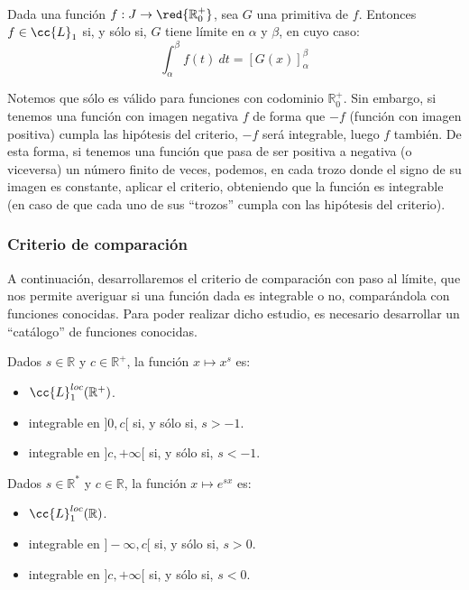 \begin{teo}\ \\
    Dada una función $f:J\rightarrow\red{\mathbb{R}^+_0}$, sea $G$ una primitiva de $f$. Entonces $f\in \cc{L}_1$ si, y sólo si, $G$ tiene límite en $\alpha$ y $\beta$, en cuyo caso:
    \begin{equation*}
        \displaystyle\int_{\alpha}^{\beta} f(t)~dt  = {[G(x)]}_\alpha^\beta
    \end{equation*}
\end{teo}
Notemos que sólo es válido para funciones con codominio $\mathbb{R}^+_0$. Sin embargo, si tenemos una función con imagen negativa $f$ de forma que $-f$ (función con imagen positiva) cumpla las hipótesis del criterio, $-f$ será integrable, luego $f$ también. De esta forma, si tenemos una función que pasa de ser positiva a negativa (o viceversa) un número finito de veces, podemos, en cada trozo donde el signo de su imagen es constante, aplicar el criterio, obteniendo que la función es integrable (en caso de que cada uno de sus ``trozos'' cumpla con las hipótesis del criterio).

\subsubsection{Criterio de comparación}
A continuación, desarrollaremos el criterio de comparación con paso al límite, que nos permite averiguar si una función dada es integrable o no, comparándola con funciones conocidas. Para poder realizar dicho estudio, es necesario desarrollar un ``catálogo'' de funciones conocidas.

\begin{ejercicio*}
    Dados $s\in \mathbb{R}$ y $c\in \mathbb{R}^+$, la función $x\mapsto x^s$ es:
    \begin{itemize}
        \item $\cc{L}_1^{loc}(\mathbb{R}^+)$.
        \item integrable en $]0,c[$ si, y sólo si, $s > -1$.
        \item integrable en $]c,+\infty[$ si, y sólo si, $s < -1$.
    \end{itemize}
\end{ejercicio*}

\begin{ejercicio*}
    Dados $s\in \mathbb{R}^*$ y $c\in \mathbb{R}$, la función $x\mapsto e^{sx}$ es:
    \begin{itemize}
        \item $\cc{L}_1^{loc}(\mathbb{R})$.
        \item integrable en $]-\infty, c[$ si, y sólo si, $s>0$.
        \item integrable en $]c, +\infty[$ si, y sólo si, $s<0$.
    \end{itemize}
\end{ejercicio*}

